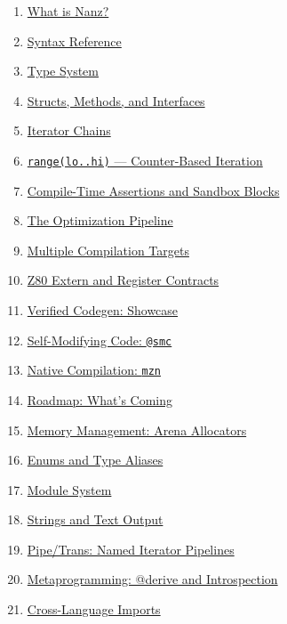 \documentclass[
  11pt,
]{article}
\providecommand{\tightlist}{%
  \setlength{\itemsep}{0pt}\setlength{\parskip}{0pt}}
\begin{document}
\begin{enumerate}
\def\labelenumi{\arabic{enumi}.}
\tightlist
\item
  \protect\hyperlink{chapter-1-what-is-nanz}{What is Nanz?}
\item
  \protect\hyperlink{chapter-2-syntax-reference}{Syntax Reference}
\item
  \protect\hyperlink{chapter-3-type-system}{Type System}
\item
  \protect\hyperlink{chapter-4-structs-methods-and-interfaces}{Structs,
  Methods, and Interfaces}
\item
  \protect\hyperlink{chapter-5-iterator-chains}{Iterator Chains}
\item
  \protect\hyperlink{chapter-6-range-counter-based-iteration}{\texttt{range(lo..hi)}
  --- Counter-Based Iteration}
\item
  \protect\hyperlink{chapter-7-compile-time-assertions-and-sandbox-blocks}{Compile-Time
  Assertions and Sandbox Blocks}
\item
  \protect\hyperlink{chapter-8-the-optimization-pipeline}{The
  Optimization Pipeline}
\item
  \protect\hyperlink{chapter-9-multiple-compilation-targets}{Multiple
  Compilation Targets}
\item
  \protect\hyperlink{chapter-10-z80-extern-and-register-contracts}{Z80
  Extern and Register Contracts}
\item
  \protect\hyperlink{chapter-11-verified-codegen-showcase}{Verified
  Codegen: Showcase}
\item
  \protect\hyperlink{chapter-12-self-modifying-code-smc}{Self-Modifying
  Code: \texttt{@smc}}
\item
  \protect\hyperlink{chapter-13-native-compilation-mzn}{Native
  Compilation: \texttt{mzn}}
\item
  \protect\hyperlink{chapter-14-roadmap-whats-coming}{Roadmap: What's
  Coming}
\item
  \protect\hyperlink{chapter-15-memory-management-arena-allocators}{Memory
  Management: Arena Allocators}
\item
  \protect\hyperlink{chapter-16-enums-and-type-aliases}{Enums and Type
  Aliases}
\item
  \protect\hyperlink{chapter-17-module-system}{Module System}
\item
  \protect\hyperlink{chapter-18-strings-and-text-output}{Strings and
  Text Output}
\item
  \protect\hyperlink{chapter-19-pipetrans-named-iterator-pipelines}{Pipe/Trans:
  Named Iterator Pipelines}
\item
  \protect\hyperlink{chapter-20-metaprogramming-derive-and-introspection}{Metaprogramming:
  @derive and Introspection}
\item
  \protect\hyperlink{chapter-21-cross-language-imports}{Cross-Language
  Imports}
\end{enumerate}
\end{document}
